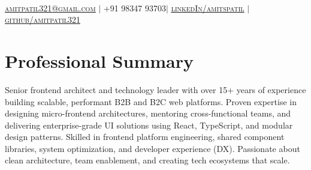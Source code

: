 \documentclass[]{resume-openfont}
\begin{document}
\newcommand{\yourName}{Amit Patil}
\newcommand{\yourWebsite}{website.com}
\newcommand{\yourWebsiteLink}{https://website.com}
\newcommand{\yourEmail}{amitpatil321@gmail.com}
\newcommand{\yourPhone}{+91 98347 93703}
\newcommand{\githubUserName}{amitpatil321}
\newcommand{\linkedInUserName}{amitspatil}


\begin{center}
    \Huge \scshape \latoRegular{\yourName} \\ \vspace{8pt}
    \small \href{mailto:\yourEmail}{\underline{\yourEmail}}  $|$  \yourPhone $|$ 
    \href{https://www.linkedin.com/in/\linkedInUserName}{\underline{linkedIn/\linkedInUserName}} $|$
    \href{https://github.com/\githubUserName}{\underline{github/\githubUserName}} 
\end{center}

\section{Professional Summary}
Senior frontend architect and technology leader with over 15+ years of experience building scalable, performant B2B and B2C web platforms. Proven expertise in designing micro-frontend architectures, mentoring cross-functional teams, and delivering enterprise-grade UI solutions using React, TypeScript, and modular design patterns. Skilled in frontend platform engineering, shared component libraries, system optimization, and developer experience (DX). Passionate about clean architecture, team enablement, and creating tech ecosystems that scale.
\end{document}
